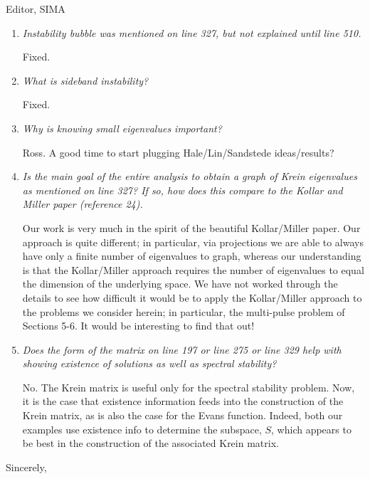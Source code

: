 \documentclass[11pt]{letter}
\begin{document}
\begin{letter}{Editor, SIMA}
\begin{enumerate}
\item \emph{Instability bubble was mentioned on line 327, but not explained until line 510.}

Fixed.

\item \emph{What is sideband instability?}

Fixed.

\item \emph{Why is knowing small eigenvalues important?}

Ross. A good time to start plugging Hale/Lin/Sandstede ideas/results?

\item \emph{Is the main goal of the entire analysis to obtain a graph of Krein eigenvalues as mentioned on line 327? If so, how does this compare to the Kollar and Miller paper (reference 24). }

Our work is very much in the spirit of the beautiful Kollar/Miller paper. Our approach is quite different; in particular, via projections we are able to always have only a finite number of eigenvalues to graph, whereas our understanding is that the Kollar/Miller approach requires the number of eigenvalues to equal the dimension of the underlying space. We have not worked through the details to see how difficult it would be to apply the Kollar/Miller approach to the problems we consider herein; in particular, the multi-pulse problem of Sections 5-6. It would be interesting to find that out!

\item \emph{Does the form of the matrix on line 197 or line 275 or line 329 help with showing existence of solutions as well as spectral stability?}

No. The Krein matrix is useful only for the spectral stability problem. Now, it is the case that existence information feeds into the construction of the Krein matrix, as is also the case for the Evans function. Indeed, both our examples use existence info to determine the subspace, $S$, which appears to be best in the construction of the associated Krein matrix.

\end{enumerate}


\closing{Sincerely,}

\end{letter}
\end{document}
